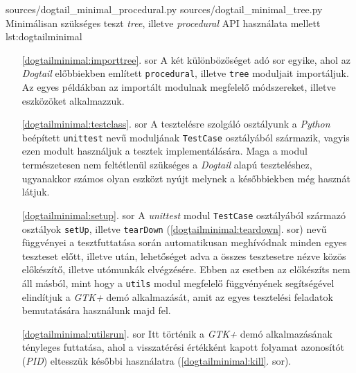 \lstdoublepysource
{sources/dogtail_minimal_procedural.py}
{sources/dogtail_minimal_tree.py}
{Minimálisan szükséges teszt \textit{tree}, illetve \textit{procedural} API használata mellett}
{lst:dogtailminimal}

\begin{enumerate}
 \item[\ref{dogtailminimal:importtree}. sor] A két különbözőséget adó sor egyike, ahol az \textit{Dogtail} előbbiekben említett \texttt{procedural}, illetve \texttt{tree} moduljait importáljuk. Az egyes példákban az importált modulnak megfelelő módszereket, illetve eszközöket alkalmazzuk.

 \item[\ref{dogtailminimal:testclass}. sor] A tesztelésre szolgáló osztályunk a \textit{Python} beépített \texttt{unittest} nevű moduljának \texttt{TestCase} osztályából származik, vagyis ezen modult használjuk a tesztek implementálására. Maga a modul természetesen nem feltétlenül szükséges a \textit{Dogtail} alapú teszteléshez, ugyanakkor számos olyan eszközt nyújt melynek a későbbiekben még hasznát látjuk.

 \item[\ref{dogtailminimal:setup}. sor] A \textit{unittest} modul \texttt{TestCase} osztályából származó osztályok \texttt{setUp}, illetve \texttt{tearDown} (\ref{dogtailminimal:teardown}. sor) nevű függvényei a tesztfuttatása során automatikusan meghívódnak minden egyes teszteset előtt, illetve után, lehetőséget adva a összes tesztesetre nézve közös előkészítő, illetve utómunkák elvégzésére. Ebben az esetben az előkészíts nem áll másból, mint hogy a \texttt{utils} modul megfelelő függvényének segítségével elindítjuk a \textit{GTK+} demó alkalmazását, amit az egyes tesztelési feladatok bemutatására használunk majd fel.

\item[\ref{dogtailminimal:utilsrun}. sor] Itt történik a \textit{GTK+} demó alkalmazásának tényleges futtatása, ahol a visszatérési értékként kapott folyamat azonosítót (\textit{PID}) eltesszük későbbi használatra (\ref{dogtailminimal:kill}. sor).


\end{enumerate}
